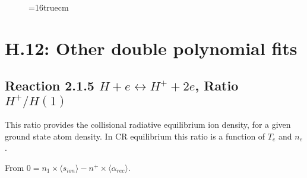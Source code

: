 \documentclass[12pt,dvipdfmx]{article}
\begin{document}
\begin{figure} \label{7.0}
\epsfxsize=16truecm
\end{figure}

\newpage

\section{H.12: Other double polynomial fits}

\subsection{
Reaction 2.1.5   $H + e \leftrightarrow H^+ +2e$,  Ratio $H^+/H(1)$
}
This ratio provides the collisional radiative equilibrium ion
density, for a given ground state atom density.
In CR equilibrium this ratio is a function of $T_e$ and $n_e$.

From $0 = n_1 \times  \langle s_{ion} \rangle - n^+ \times \langle\alpha_{rec} \rangle$.
\end{document}
